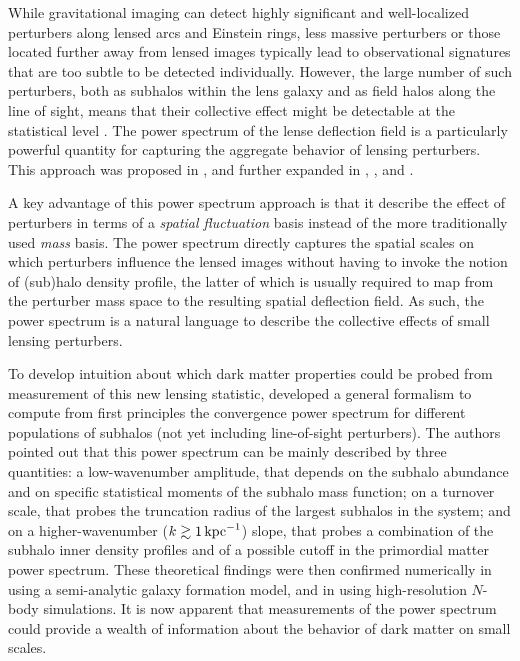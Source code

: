 \documentclass[modern,linenumbers]{aastex62}
\begin{document}
While gravitational imaging can detect highly significant and well-localized perturbers along lensed arcs and Einstein rings, less massive perturbers or those located further away from lensed images typically lead to observational signatures that are too subtle to be detected individually. However, the large number of such perturbers, both as subhalos within the lens galaxy and as field halos along the line of sight, means that their collective effect might be detectable at the statistical level \citep[\eg,][]{Birrer2017}. The power spectrum of the lense deflection field is a particularly powerful quantity for capturing the aggregate behavior of lensing perturbers. This approach was proposed in \cite{Hezaveh_2014}, and further expanded in \cite{Rivero:2017mao}, \cite{Chatterjee_2017}, and \cite{Cyr-Racine:2018htu}. 

A key advantage of this power spectrum approach is that it describe the effect of perturbers in terms of a \emph{spatial fluctuation} basis instead of the more traditionally used \emph{mass} basis. The power spectrum directly captures the spatial scales on which perturbers influence the lensed images without having to invoke the notion of (sub)halo density profile, the latter of which is usually required to map from the perturber mass space to the resulting spatial deflection field. As such, the power spectrum is a natural language to describe the collective effects of small lensing perturbers. 

To develop intuition about which dark matter properties could be probed from measurement of this new lensing statistic, \cite{Rivero:2017mao} developed a general formalism to compute from first principles the convergence power spectrum for different populations of subhalos (not yet including line-of-sight perturbers). The authors pointed out that this power spectrum can be mainly described by three quantities: a low-wavenumber amplitude, that depends on the subhalo abundance and on specific statistical moments of the subhalo mass function; on a turnover scale, that probes the truncation radius of the largest subhalos in the system; and on a higher-wavenumber ($k\gtrsim 1 \mathrm{\,kpc}^{-1}$) slope, that probes a combination of the subhalo inner density profiles and of a possible cutoff in the primordial matter power spectrum. These theoretical findings were then confirmed numerically in \cite{Brennan:2018jhq} using a semi-analytic galaxy formation model, and in \cite{Rivero:2018bcd} using high-resolution $N$-body simulations. It is now apparent that measurements of the power spectrum could provide a wealth of information about the behavior of dark matter on small scales.
\end{document}
